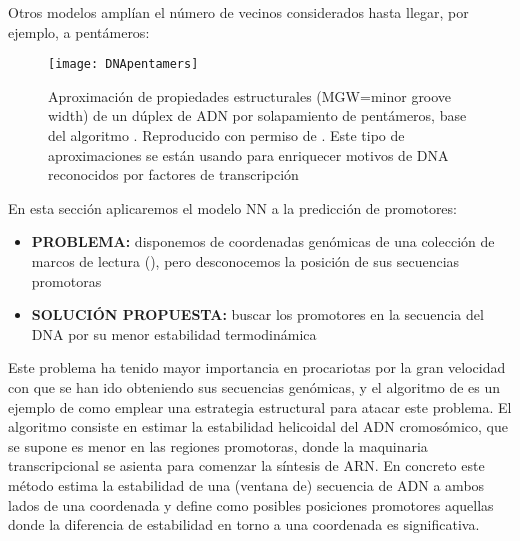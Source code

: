


Otros modelos ampl\'{i}an el n\'{u}mero de vecinos considerados hasta llegar, por ejemplo, a pent\'{a}meros:

\begin{figure}
\begin{center} 
\texttt{[image: DNApentamers]}
\caption{Aproximaci\'{o}n de propiedades estructurales (MGW=minor groove width) de un d\'{u}plex de ADN por solapamiento de pent\'{a}meros, 
base del algoritmo . 
Reproducido con permiso de \citet{Zhou2013}.
Este tipo de aproximaciones se est\'{a}n usando para enriquecer motivos de DNA reconocidos por factores de transcripci\'{o}n \citep{Yang2015}}
\label{fig:NN5}
\end{center}
\end{figure}

En esta secci\'{o}n aplicaremos el modelo NN a la predicci\'{o}n de promotores:

\begin{itemize}
\item \textbf{PROBLEMA:} disponemos de coordenadas gen\'{o}micas de una colecci\'{o}n de marcos de lectura 
(), 
pero desconocemos la posici\'{o}n de sus secuencias promotoras
\item \textbf{SOLUCI\'{O}N PROPUESTA:} buscar los promotores en la secuencia del DNA por su menor estabilidad termodin\'{a}mica
\end{itemize}

Este problema ha tenido mayor importancia en procariotas por la gran velocidad con que se han ido obteniendo sus secuencias gen\'{o}micas, 
y el algoritmo de \cite{Kanhere2005} es un ejemplo de como emplear una estrategia estructural para atacar este problema. 
El algoritmo consiste en estimar la estabilidad helicoidal del ADN cromos\'{o}mico, que se supone es menor en
las regiones promotoras, donde la maquinaria transcripcional se asienta para comenzar la s\'{i}ntesis de ARN. 
En concreto este m\'{e}todo estima la estabilidad de una (ventana de) secuencia de ADN a ambos lados de una coordenada y define como posibles
posiciones promotores aquellas donde la diferencia de estabilidad en torno a una coordenada es significativa. 


